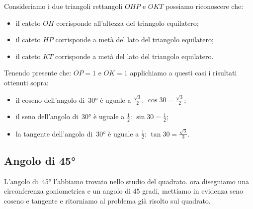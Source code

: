  \begin{minipage}{.45\textwidth}
  \begin{center}
\begin{inaccessibleblock}
    
\end{inaccessibleblock}
  \end{center}
 \end{minipage}
 \begin{minipage}{.45\textwidth}
Consideriamo i due triangoli rettangoli $OHP$ e $OKT$ possiamo riconoscere 
che:
\begin{itemize} [noitemsep]
 \item il cateto $OH$ corrisponde all'altezza del triangolo equilatero; 
 \item il cateto $HP$ corrisponde a metà del lato del triangolo equilatero;
 \item il cateto $KT$ corrisponde a metà del lato del triangolo equilatero.\\
\end{itemize}
 \end{minipage}

Tenendo presente che: $OP=1$ e $OK=1$ applichiamo a questi casi i risultati 
ottenuti sopra:
\begin{itemize} [noitemsep]
 \item il coseno dell'angolo di~30° è uguale a $\frac{\sqrt{3}}{2}$: 
  $\cos 30 = \frac{\sqrt{3}}{2}$; 
 \item il seno dell'angolo di~30° è uguale a $\frac{1}{2}$: 
  $\sin 30 = \frac{1}{2}$; 
 \item la tangente dell'angolo di~30° è uguale a $\frac{1}{2}$: 
  $\tan 30 = \frac{\sqrt{3}}{3}$.
\end{itemize}

\subsection{Angolo di 45°}

L'angolo di~45° l'abbiamo trovato nello studio del quadrato. ora 
disegniamo una circonferenza goniometrica e un angolo di 45 gradi, mettiamo 
in evidenza seno coseno e tangente e ritorniamo al problema già risolto sul 
quadrato.\\

